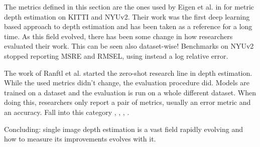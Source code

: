 \vfill

The metrics defined in this section are the ones used by Eigen et al. in \cite{Eigen} for metric depth estimation on KITTI and NYUv2.
Their work was the first deep learning based approach to depth estimation and has been taken as a reference for a long time.
As this field evolved, there has been some change in how researchers evaluated their work.
This can be seen also dataset-wise!
Benchmarks on NYUv2 stopped reporting MSRE and RMSEL, using instead a log relative error.

The work of Ranftl et al. \cite{MiDas} started the zero-shot research line in depth estimation.
While the used metrics didn't change, the evaluation procedure did.
Models are trained on a dataset and the evaluation is run on a whole different dataset.
When doing this, researchers only report a pair of metrics, usually an error metric and an accuracy.
Fall into this category \cite{MiDas}, \cite{PatchFusion}, \cite{Marigold}, \cite{ZoeDepth}.

Concluding: single image depth estimation is a vast field rapidly evolving and how to measure its improvements evolves with it.

